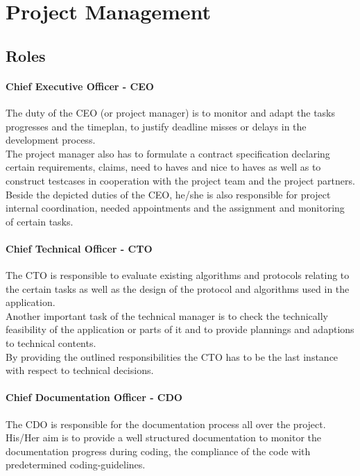 
\section{Project Management}

\subsection{Roles}

\paragraph{Chief Executive Officer - CEO}
\label{sec:pm:roles:ceo}
The duty of the CEO (or project manager) is to monitor and adapt the tasks progresses and the timeplan, 
to justify deadline misses or delays in the development process.\\

The project manager also has to formulate a contract specification declaring certain requirements, 
claims, need to haves and nice to haves as well as to construct testcases in cooperation with the project 
team and the project partners.\\

Beside the depicted duties of the CEO, he/she is also responsible for project internal coordination, 
needed appointments and the assignment and monitoring of certain tasks.\\


\paragraph{Chief Technical Officer - CTO}
\label{sec:pm:roles:cto}
The CTO is responsible to evaluate existing algorithms and protocols relating to the certain 
tasks as well as the design of the protocol and algorithms used in the application.\\

Another important task of the technical manager is to check the technically feasibility 
of the application or parts of it and to provide plannings and adaptions to technical contents.\\

By providing the outlined responsibilities the CTO has to be the last instance with respect to technical decisions.\\


\paragraph{Chief Documentation Officer - CDO}
\label{sec:pm:roles:cdo}
The CDO is responsible for the documentation process all over the project. 
His/Her aim is to provide a well structured documentation to monitor the documentation progress during coding, 
the compliance of the code with predetermined coding-guidelines.\\

